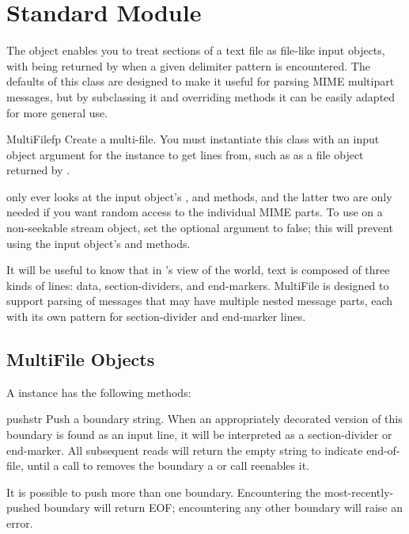 \section{Standard Module }
\label{module-multifile}

The  object enables you to treat sections of a text
file as file-like input objects, with  being returned by
 when a given delimiter pattern is encountered.  The
defaults of this class are designed to make it useful for parsing
MIME multipart messages, but by subclassing it and overriding methods 
it can be easily adapted for more general use.

\begin{classdesc}{MultiFile}{fp}
Create a multi-file.  You must instantiate this class with an input
object argument for the  instance to get lines from,
such as as a file object returned by .

 only ever looks at the input object's
,  and  methods, and
the latter two are only needed if you want random access to the
individual MIME parts. To use  on a non-seekable
stream object, set the optional  argument to false; this
will prevent using the input object's  and
 methods.
\end{classdesc}

It will be useful to know that in 's view of the world, text
is composed of three kinds of lines: data, section-dividers, and
end-markers.  MultiFile is designed to support parsing of
messages that may have multiple nested message parts, each with its
own pattern for section-divider and end-marker lines.

\subsection{MultiFile Objects}
\label{MultiFile-objects}

A  instance has the following methods:

\begin{methoddesc}{push}{str}
Push a boundary string.  When an appropriately decorated version of
this boundary is found as an input line, it will be interpreted as a
section-divider or end-marker.  All subsequent
reads will return the empty string to indicate end-of-file, until a
call to  removes the boundary a or  call
reenables it.

It is possible to push more than one boundary.  Encountering the
most-recently-pushed boundary will return EOF; encountering any other
boundary will raise an error.
\end{methoddesc}

